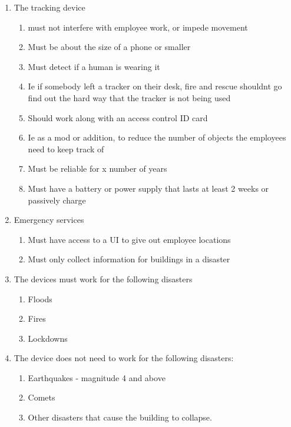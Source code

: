 \documentclass[12pt]{article}
\begin{document}
	\begin{enumerate}
		\item The tracking device
			\begin{enumerate}
				\item must not interfere with employee work, or impede movement
				\item Must be about the size of a phone or smaller
				\item Must detect if a human is wearing it
				\item Ie if somebody left a tracker on their desk,
					fire and rescue shouldnt go find out the hard way that the tracker is not being used
				\item Should work along with an access control ID card
				\item Ie as a mod or addition, to reduce the number of objects the employees need to keep track of
				\item Must be reliable for x number of years
				\item Must have a battery or power supply that lasts at least 2 weeks or passively charge
			\end{enumerate}


		\item Emergency services
			\begin{enumerate}
				\item Must have access to a UI to give out employee locations
				\item Must only collect information for buildings in a disaster
			\end{enumerate}


		\item The devices must work for the following disasters
			\begin{enumerate}
				\item Floods
				\item Fires
				\item Lockdowns
			\end{enumerate}
		\item The device does not need to work for the following disasters:
			\begin{enumerate}
				\item Earthquakes - magnitude 4 and above
				\item Comets
				\item Other disasters that cause the building to collapse.
			\end{enumerate}
	\end{enumerate}
\end{document}
